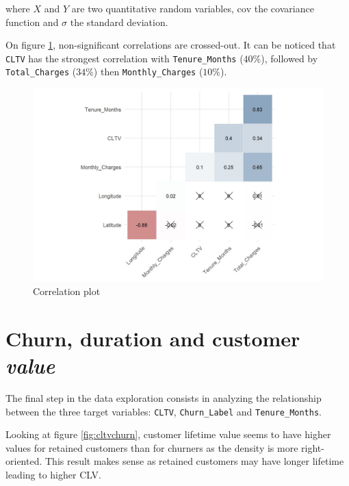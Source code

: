 \documentclass[
]{book}
\begin{document}
where \(X\) and \(Y\) are two quantitative random variables, \(\text{cov}\) the covariance function and \(\sigma\) the standard deviation.

On figure \ref{fig:corrplot}, non-significant correlations are crossed-out. It can be noticed that \texttt{CLTV} has the strongest correlation with \texttt{Tenure\_Months} (\(40\%\)), followed by \texttt{Total\_Charges} (\(34\%\)) then \texttt{Monthly\_Charges} (\(10\%\)).

\begin{figure}

{\centering \includegraphics[width=25in]{./imgs/corr_plot} 

}

\caption{Correlation plot}\label{fig:corrplot}
\end{figure}

\hypertarget{churn-duration-and-customer-value}{%
\section{\texorpdfstring{Churn, duration and customer \emph{value}}{Churn, duration and customer value}}\label{churn-duration-and-customer-value}}

The final step in the data exploration consists in analyzing the relationship between the three target variables: \texttt{CLTV}, \texttt{Churn\_Label} and \texttt{Tenure\_Months}.

Looking at figure \ref{fig:cltvchurn}, customer lifetime value seems to have higher values for retained customers than for churners as the density is more right-oriented. This result makes sense as retained customers may have longer lifetime leading to higher CLV.
\end{document}
